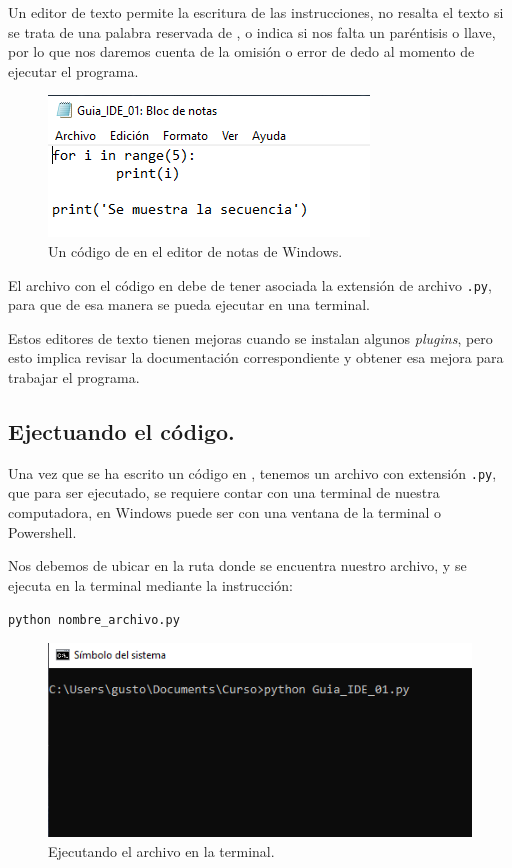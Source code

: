 Un editor de texto permite la escritura de las instrucciones, no resalta el texto si se trata de una palabra reservada de \python, o indica si nos falta un paréntisis o llave, por lo que nos daremos cuenta de la omisión o error de dedo al momento de ejecutar el programa.
\begin{figure}[H]
    \centering
    \includegraphics[scale=1]{Imagenes/Guia_IDE_00.png}
    \caption{Un código de \python en el editor de notas de Windows.}
\end{figure}
El archivo con el código en \python{} debe de tener asociada la extensión de archivo \texttt{.py}, para que de esa manera se pueda ejecutar en una terminal.
\par 
Estos editores de texto tienen mejoras cuando se instalan algunos \textit{plugins}, pero esto implica revisar la documentación correspondiente y obtener esa mejora para trabajar el programa.

\subsection{Ejectuando el código.}

Una vez que se ha escrito un código en \python, tenemos un archivo con extensión \texttt{.py}, que para ser ejecutado, se requiere contar con una terminal de nuestra computadora, en Windows puede ser con una ventana de la terminal o Powershell.
\par
Nos debemos de ubicar en la ruta donde se encuentra nuestro archivo, y se ejecuta en la terminal mediante la instrucción:
\begin{center}
\texttt{python nombre\_archivo.py} \quad \keys{\return}
\end{center}

\begin{figure}[H]
    \centering
    \includegraphics{Imagenes/Guia_IDE_04.png}
    \caption{Ejecutando el archivo en la terminal.}
\end{figure}

